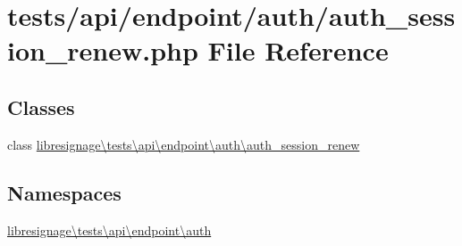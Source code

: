 \hypertarget{tests_2api_2endpoint_2auth_2auth__session__renew_8php}{}\section{tests/api/endpoint/auth/auth\+\_\+session\+\_\+renew.php File Reference}
\label{tests_2api_2endpoint_2auth_2auth__session__renew_8php}
\subsection*{Classes}
\begin{DoxyCompactItemize}
\item 
class \hyperlink{classlibresignage_1_1tests_1_1api_1_1endpoint_1_1auth_1_1auth__session__renew}{libresignage\textbackslash{}tests\textbackslash{}api\textbackslash{}endpoint\textbackslash{}auth\textbackslash{}auth\+\_\+session\+\_\+renew}
\end{DoxyCompactItemize}
\subsection*{Namespaces}
\begin{DoxyCompactItemize}
\item 
 \hyperlink{namespacelibresignage_1_1tests_1_1api_1_1endpoint_1_1auth}{libresignage\textbackslash{}tests\textbackslash{}api\textbackslash{}endpoint\textbackslash{}auth}
\end{DoxyCompactItemize}
